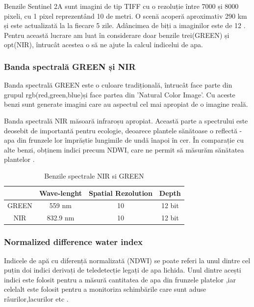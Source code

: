 \documentclass[12pt,a4paper]{article}
\theoremstyle{definition}
\theoremstyle{remark}
\begin{document}
Benzile Sentinel 2A sunt imagini de tip TIFF cu o rezoluție între 7000 și 8000 pixeli,
cu 1 pixel reprezentând 10 de metri. O scenă acoperă aproximativ 290 km și este actualizată la
la fiecare 5 zile. Adâncimea de biți a imaginilor este de 12 . Pentru această lucrare am luat în considerare doar benzile trei(GREEN) și opt(NIR), întrucât acestea o să ne ajute la calcul indicelui de apa.

\subsubsection{Banda spectrală GREEN și NIR}

Banda spectrală GREEN este o culoare tradițională, întrucât face parte din grupul rgb(red,green,blue)și face partea din 'Natural Color Image'. Cu aceste benzi sunt generate imagini care au aspectul cel mai apropiat de o imagine reală.

Banda spectrală NIR măsoară infraroșu apropiat. Această parte a spectrului este deosebit de importantă pentru ecologie, deoarece plantele sănătoase o reflectă - apa din frunzele lor împrăștie lungimile de undă înapoi în cer. În comparație cu alte benzi, obținem indici precum NDWI, care ne permit să măsurăm sănătatea plantelor \cite{green}.


\begin{table}[ht]
\caption{Benzile spectrale NIR si GREEN \cite{nir}} %
\centering %
\begin{tabular}{c c c c} %
\hline\hline %
 & Wave-lenght & Spatial Rezolution & Depth\\ [0.5ex] %
\hline %
GREEN& 559 nm & 10 & 12 bit \\ %
NIR & 832.9 nm & 10 & 12 bit\\
\hline %
\end{tabular}
\label{table:nonlin} %
\end{table}


\subsubsection{Normalized difference water index}

Indicele de apă cu diferență normalizată (NDWI) se poate referi la unul dintre cel puțin doi indici derivați de teledetecție legați de apa lichida. Unul dintre acești indici este folosit pentru a măsură cantitatea de apa din frunzele platelor ,iar celelalt este folosit pentru a monitoriza schimbările care sunt aduse râurilor,lacurilor etc \cite{ndwi}.
\end{document}
